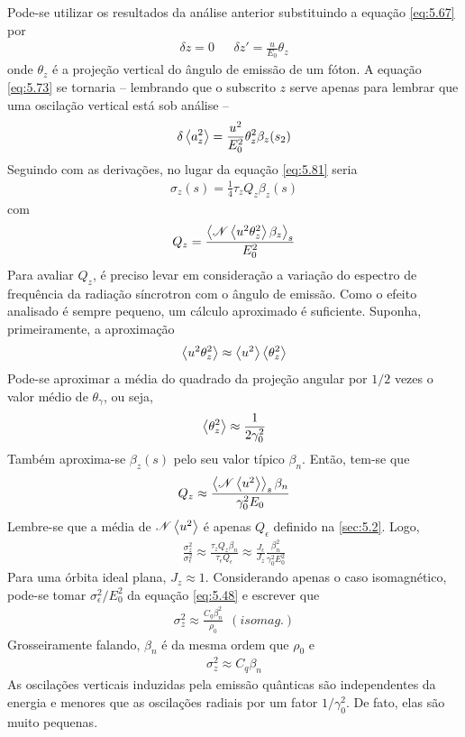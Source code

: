 Pode-se utilizar os resultados da análise anterior substituindo a equação \eqref{eq:5.67} por
\begin{align}
	\delta z = 0\ \ \ \ \ \ \ \delta z' = \frac{u}{E_0}\theta_z
\end{align}
onde $\theta_z$ é a projeção vertical do ângulo de emissão de um fóton. A equação \eqref{eq:5.73} se tornaria -- lembrando que o subscrito $z$ serve apenas para lembrar que uma oscilação vertical está sob análise --
\begin{align}
	\delta \left< a_z^2 \right> = \frac{u^2}{E_0^2} \theta_z^2 \beta_z(s_2)
\end{align}
Seguindo com as derivações, no lugar da equação \eqref{eq:5.81} seria
\begin{align}
	\sigma_{z}(s) = \frac{1}{4} \tau_z Q_z \beta_z(s)
\end{align}
com
\begin{align}
	Q_z = \frac{\left< \mathscr{N}\left< u^2 \theta_z^2 \right>\beta_z \right>_s}{E_0^2}
\end{align}
Para avaliar $Q_z$, é preciso levar em consideração a variação do espectro de frequência da radiação síncrotron com o ângulo de emissão. Como o efeito analisado é sempre pequeno, um cálculo aproximado é suficiente. Suponha, primeiramente, a aproximação
\begin{align}
	\left< u^2 \theta_z^2 \right> \approx \left< u^2 \right>\left< \theta_z^2 \right>
\end{align}
Pode-se aproximar a média do quadrado da projeção angular por $1/2$ vezes o valor médio de $\theta_\gamma$, ou seja,
\begin{align}
	\left< \theta_z^2 \right> \approx \frac{1}{2 \gamma_0^2}
\end{align}
Também aproxima-se $\beta_z(s)$ pelo seu valor típico $\beta_n$. Então, tem-se que
\begin{align}
	Q_z \approx \frac{\left< \mathscr{N}\left< u^2 \right> \right>_s \beta_n}{\gamma_0^2 E_0}
\end{align}
Lembre-se que a média de $\mathscr{N}\left< u^2 \right>$ é apenas $Q_\epsilon$ definido na \autoref{sec:5.2}. Logo,
\begin{align}
	\frac{\sigma_z^2}{\sigma_\epsilon^2} \approx \frac{\tau_z Q_z \beta_n}{\tau_\epsilon Q_\epsilon} \approx \frac{J_\epsilon}{J_z}\frac{\beta_n^2}{\gamma_0^2 E_0^2}
\end{align}
Para uma órbita ideal plana, $J_z \approx 1$. Considerando apenas o caso isomagnético, pode-se tomar $\sigma_\epsilon^2/E_0^2$ da equação \eqref{eq:5.48} e escrever que
\begin{align}
	\sigma_z^2 \approx \frac{C_q \beta_n^2}{\rho_0}\ \ (isomag.)\label{eq:5.107}
\end{align}
Grosseiramente falando, $\beta_n$ é da mesma ordem que $\rho_0$ e
\begin{align}
	\sigma_z^2 \approx C_q \beta_n
\end{align}
As oscilações verticais induzidas pela emissão quânticas são independentes da energia e menores que as oscilações radiais por um fator $1/\gamma_0^2$. De fato, elas são muito pequenas.


